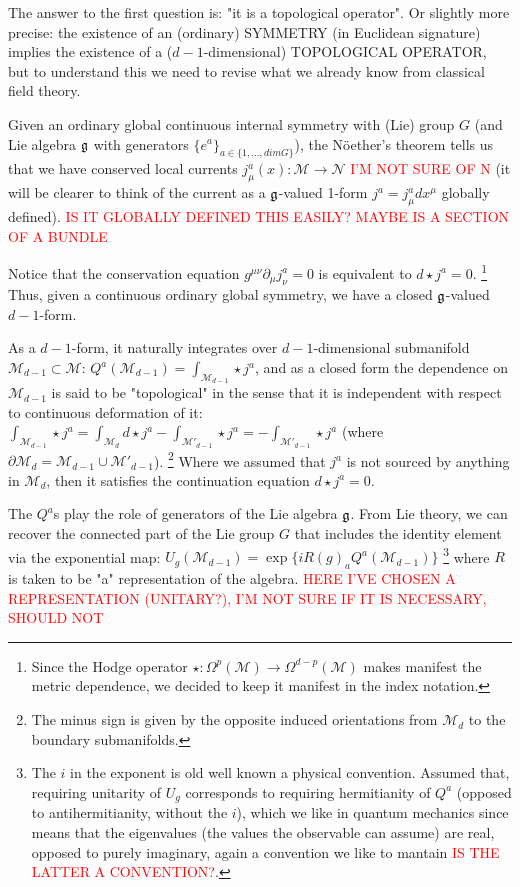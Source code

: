 \documentclass[aps,preprint,nofootinbib,preprintnumbers,eqsecnum,superscriptaddress]{revtex4}
\numberwithin{equation}{section}
\begin{document}
The answer to the first question is: "it is a topological operator". Or slightly more precise: the existence of an (ordinary) SYMMETRY (in Euclidean signature) implies the existence of a ($d-1$-dimensional) TOPOLOGICAL OPERATOR, but to understand this we need to revise what we already know from classical field theory.

Given an ordinary global continuous internal symmetry with (Lie) group $G$ (and Lie algebra $\frak{g}$ with generators $\{e^a\}_{a\in \{1,..., dim G \}}$), the Nöether's theorem tells us that we have conserved local currents $j^a_\mu (x):\mathcal{M} \to \mathcal{N}$ \textcolor{red}{I'M NOT SURE OF N} (it will be clearer to think of the current as a $\frak{g}$-valued 1-form $j^a=j^a_\mu dx^\mu$ globally defined).
\textcolor{red}{IS IT GLOBALLY DEFINED THIS EASILY? MAYBE IS A SECTION OF A BUNDLE}

Notice that the conservation equation $g^{\mu \nu}\partial_\mu j_\nu^a = 0$ is equivalent to $d \star j^a=0$. \footnote{Since the Hodge operator $\star:\Omega^p(\mathcal{M}) \to \Omega^{d-p}(\mathcal{M})$ makes manifest the metric dependence, we decided to keep it manifest in the index notation.} Thus, given a continuous ordinary global symmetry, we have a closed $\frak{g}$-valued $d-1$-form.

As a $d-1$-form, it naturally integrates over $d-1$-dimensional submanifold $\mathcal{M}_{d-1} \subset \mathcal{M}$: $Q^a(\mathcal{M}_{d-1}) = \int_{\mathcal{M}_{d-1}}\star j^a $, and as a closed form the dependence on $\mathcal{M}_{d-1}$ is said to be "topological" in the sense that it is independent with respect to continuous deformation of it: $\int_{\mathcal{M}_{d-1}}\star j^a = \int_{\mathcal{M}_{d}} d \star j^a - \int_{\mathcal{M'}_{d-1}}\star j^a = - \int_{\mathcal{M'}_{d-1}}\star j^a$ (where $\partial\mathcal{M}_{d}=\mathcal{M}_{d-1} \cup \mathcal{M'}_{d-1}$). \footnote{The minus sign is given by the opposite induced orientations from $\mathcal{M}_{d}$ to the boundary submanifolds.} Where we assumed that $j^a$ is not sourced by anything in $\mathcal{M}_{d}$, then it satisfies the continuation equation $d\star j^a=0$.

The $Q^a$s play the role of generators of the Lie algebra $\frak{g}$. From Lie theory, we can recover the connected part of the Lie group $G$ that includes the identity element via the exponential map: $U_g(\mathcal{M}_{d-1}) = \exp \{ i R(g)_a Q^a(\mathcal{M}_{d-1}) \}$ \footnote{The $i$ in the exponent is old well known a physical convention. Assumed that, requiring unitarity of $U_g$ corresponds to requiring hermitianity of $Q^a$ (opposed to antihermitianity, without the $i$), which we like in quantum mechanics since means that the eigenvalues (the values the observable can assume) are real, opposed to purely imaginary, again a convention we like to mantain \textcolor{red}{IS THE LATTER A CONVENTION?}.} where $R$ is taken to be "a" representation of the algebra. \textcolor{red}{HERE I'VE CHOSEN A REPRESENTATION (UNITARY?), I'M NOT SURE IF IT IS NECESSARY, SHOULD NOT}
\end{document}
